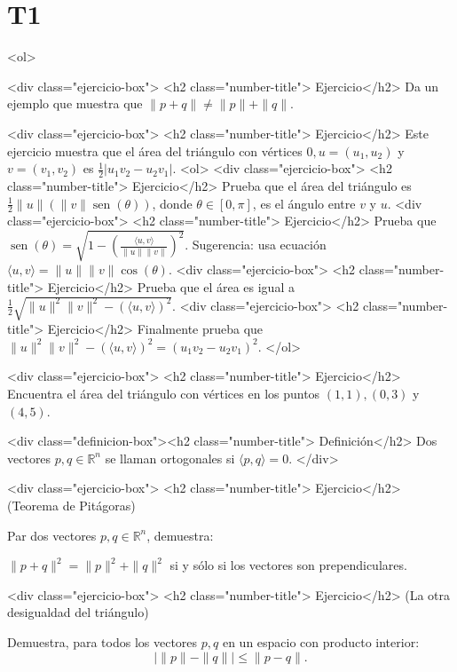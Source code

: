 \documentclass{article}
\theoremstyle{definition}
\newcommand{\sen}{\operatorname{sen}}
\begin{document}
  \section*{T1}

	<ol>

		<div class="ejercicio-box"> <h2 class="number-title"> Ejercicio</h2> Da un ejemplo que muestra que $\|p+q\|\ne \|p\|+\|q\|$.	


 <div class="ejercicio-box"> <h2 class="number-title"> Ejercicio</h2> Este ejercicio muestra que el área del triángulo con vértices  $0, u=(u_1,u_2)$ y $v=(v_1,v_2)$
       es $\frac{1}{2}|u_1v_2-u_2v_1|$.
       <ol>
       <div class="ejercicio-box"> <h2 class="number-title"> Ejercicio</h2> Prueba que el área del triángulo es $\frac{1}{2}\|u\|(\|v\| \sen(\theta))$,
         donde $\theta\in [0,\pi]$, es el ángulo entre $v$ y $u$.
       <div class="ejercicio-box"> <h2 class="number-title"> Ejercicio</h2> Prueba que $\sen(\theta)=\sqrt{1- \left( \frac{\langle u , v \rangle }{\|u\|\|v\|} \right)^2}$.
       Sugerencia: usa ecuación $\langle u, v \rangle=\|u\|\|v\|\cos(\theta)$.
       <div class="ejercicio-box"> <h2 class="number-title"> Ejercicio</h2> Prueba que el área es igual a $\frac{1}{2}\sqrt{\|u\|^2\|v\|^2-(\langle u,  v\rangle )^2}$.
       <div class="ejercicio-box"> <h2 class="number-title"> Ejercicio</h2> Finalmente prueba que $\|u\|^2\|v\|^2-(\langle u,  v\rangle )^2=(u_1v_2-u_2v_1)^2$.
       </ol>
       
        <div class="ejercicio-box"> <h2 class="number-title"> Ejercicio</h2> Encuentra el área del triángulo con vértices en los puntos $(1,1), (0,3)$ y $(4,5)$.
	
	
         <div class="definicion-box"><h2 class="number-title">  Definición</h2>
           Dos vectores $p,q\in \mathbb{R}^n$ se llaman ortogonales si $\langle p,q \rangle=0$.
         </div>
         
         
       <div class="ejercicio-box"> <h2 class="number-title"> Ejercicio</h2> (Teorema de Pitágoras)

         Par dos vectores $p, q \in \mathbb{R}^n$, demuestra:

         $\|p+q\|^2=\|p\|^2+\|q\|^2$ si y sólo si los vectores son prependiculares.

 <div class="ejercicio-box"> <h2 class="number-title"> Ejercicio</h2> (La otra desigualdad del triángulo)

                Demuestra, para todos  los vectores $p,q$ en un espacio con producto interior:
                $$
                |\|p\| - \|q\|| \leq \|p-q\|.
                $$
\end{document}
